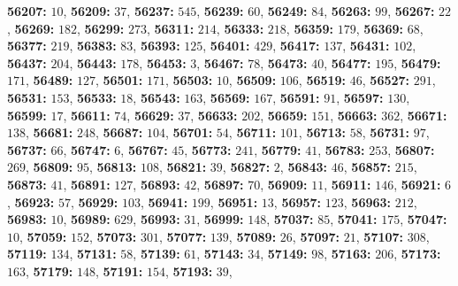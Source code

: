 \textsf{\bfseries 56207:} $10$, \textsf{\bfseries 56209:} $37$, \textsf{\bfseries 56237:} $545$, \textsf{\bfseries 56239:} $60$, \textsf{\bfseries 56249:} $84$, \textsf{\bfseries 56263:} $99$, \textsf{\bfseries 56267:} $22$, \textsf{\bfseries 56269:} $182$, \textsf{\bfseries 56299:} $273$, \textsf{\bfseries 56311:} $214$, \textsf{\bfseries 56333:} $218$, \textsf{\bfseries 56359:} $179$, \textsf{\bfseries 56369:} $68$, \textsf{\bfseries 56377:} $219$, \textsf{\bfseries 56383:} $83$, \textsf{\bfseries 56393:} $125$, \textsf{\bfseries 56401:} $429$, \textsf{\bfseries 56417:} $137$, \textsf{\bfseries 56431:} $102$, \textsf{\bfseries 56437:} $204$, \textsf{\bfseries 56443:} $178$, \textsf{\bfseries 56453:} $3$, \textsf{\bfseries 56467:} $78$, \textsf{\bfseries 56473:} $40$, \textsf{\bfseries 56477:} $195$, \textsf{\bfseries 56479:} $171$, \textsf{\bfseries 56489:} $127$, \textsf{\bfseries 56501:} $171$, \textsf{\bfseries 56503:} $10$, \textsf{\bfseries 56509:} $106$, \textsf{\bfseries 56519:} $46$, \textsf{\bfseries 56527:} $291$, \textsf{\bfseries 56531:} $153$, \textsf{\bfseries 56533:} $18$, \textsf{\bfseries 56543:} $163$, \textsf{\bfseries 56569:} $167$, \textsf{\bfseries 56591:} $91$, \textsf{\bfseries 56597:} $130$, \textsf{\bfseries 56599:} $17$, \textsf{\bfseries 56611:} $74$, \textsf{\bfseries 56629:} $37$, \textsf{\bfseries 56633:} $202$, \textsf{\bfseries 56659:} $151$, \textsf{\bfseries 56663:} $362$, \textsf{\bfseries 56671:} $138$, \textsf{\bfseries 56681:} $248$, \textsf{\bfseries 56687:} $104$, \textsf{\bfseries 56701:} $54$, \textsf{\bfseries 56711:} $101$, \textsf{\bfseries 56713:} $58$, \textsf{\bfseries 56731:} $97$, \textsf{\bfseries 56737:} $66$, \textsf{\bfseries 56747:} $6$, \textsf{\bfseries 56767:} $45$, \textsf{\bfseries 56773:} $241$, \textsf{\bfseries 56779:} $41$, \textsf{\bfseries 56783:} $253$, \textsf{\bfseries 56807:} $269$, \textsf{\bfseries 56809:} $95$, \textsf{\bfseries 56813:} $108$, \textsf{\bfseries 56821:} $39$, \textsf{\bfseries 56827:} $2$, \textsf{\bfseries 56843:} $46$, \textsf{\bfseries 56857:} $215$, \textsf{\bfseries 56873:} $41$, \textsf{\bfseries 56891:} $127$, \textsf{\bfseries 56893:} $42$, \textsf{\bfseries 56897:} $70$, \textsf{\bfseries 56909:} $11$, \textsf{\bfseries 56911:} $146$, \textsf{\bfseries 56921:} $6$, \textsf{\bfseries 56923:} $57$, \textsf{\bfseries 56929:} $103$, \textsf{\bfseries 56941:} $199$, \textsf{\bfseries 56951:} $13$, \textsf{\bfseries 56957:} $123$, \textsf{\bfseries 56963:} $212$, \textsf{\bfseries 56983:} $10$, \textsf{\bfseries 56989:} $629$, \textsf{\bfseries 56993:} $31$, \textsf{\bfseries 56999:} $148$, \textsf{\bfseries 57037:} $85$, \textsf{\bfseries 57041:} $175$, \textsf{\bfseries 57047:} $10$, \textsf{\bfseries 57059:} $152$, \textsf{\bfseries 57073:} $301$, \textsf{\bfseries 57077:} $139$, \textsf{\bfseries 57089:} $26$, \textsf{\bfseries 57097:} $21$, \textsf{\bfseries 57107:} $308$, \textsf{\bfseries 57119:} $134$, \textsf{\bfseries 57131:} $58$, \textsf{\bfseries 57139:} $61$, \textsf{\bfseries 57143:} $34$, \textsf{\bfseries 57149:} $98$, \textsf{\bfseries 57163:} $206$, \textsf{\bfseries 57173:} $163$, \textsf{\bfseries 57179:} $148$, \textsf{\bfseries 57191:} $154$, \textsf{\bfseries 57193:} $39$, 
